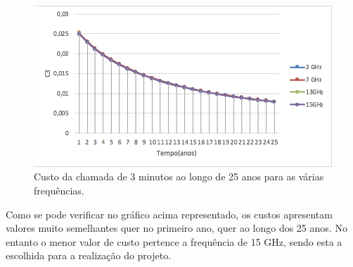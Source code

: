 \begin{figure}[H]
\centering
\includegraphics[scale=0.75]{custo_user.png}
\caption{Custo da chamada de 3 minutos ao longo de 25 anos para as várias frequências.}
\label{custo_user}
\end{figure}
 
 Como se pode verificar no gráfico acima representado, os custos apresentam valores muito semelhantes quer no primeiro ano, quer ao longo dos 25 anos. No entanto o menor valor de custo pertence a frequência de 15 GHz, sendo esta a escolhida para a realização do projeto.
 
